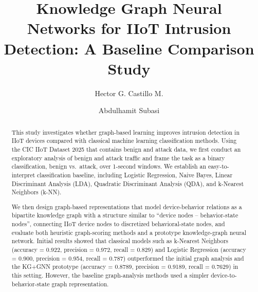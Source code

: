 \documentclass[final,5p,times,twocolumn]{elsarticle}
\begin{document}
\begin{frontmatter}




\title{Knowledge Graph Neural Networks for IIoT Intrusion Detection: A Baseline Comparison Study}

\author[label1]{Hector G. Castillo M.}

\author[label1]{Abdulhamit Subasi}





\address[label1]{College of Emergency Preparedness, Homeland Security and Cybersecurity, University at Albany, SUNY, Albany, NY, USA}

\begin{abstract}
This study investigates whether graph-based learning improves intrusion detection in IIoT devices compared with classical machine learning classification methods. Using the CIC IIoT Dataset 2025 that contains benign and attack data, we first conduct an exploratory analysis of benign and attack traffic and frame the task as a binary classification, benign vs.\ attack, over 1-second windows. We establish an easy-to-interpret classification baseline, including Logistic Regression, Naive Bayes, Linear Discriminant Analysis (LDA), Quadratic Discriminant Analysis (QDA), and k-Nearest Neighbors (k-NN).

We then design graph-based representations that model device-behavior relations as a bipartite knowledge graph with a structure similar to ``device nodes -- behavior-state nodes'', connecting IIoT device nodes to discretized behavioral-state nodes, and evaluate both heuristic graph-scoring methods and a prototype knowledge-graph neural network. Initial results showed that classical models such as k-Nearest Neighbors (accuracy = 0.922, precision = 0.972, recall = 0.829) and Logistic Regression (accuracy = 0.900, precision = 0.954, recall = 0.787) outperformed the initial graph analysis and the KG+GNN prototype (accuracy = 0.8789, precision = 0.9189, recall = 0.7629) in this setting. However, the baseline graph-analysis methods used a simpler device-to-behavior-state graph representation.


\end{abstract}
\end{frontmatter}
\end{document}
